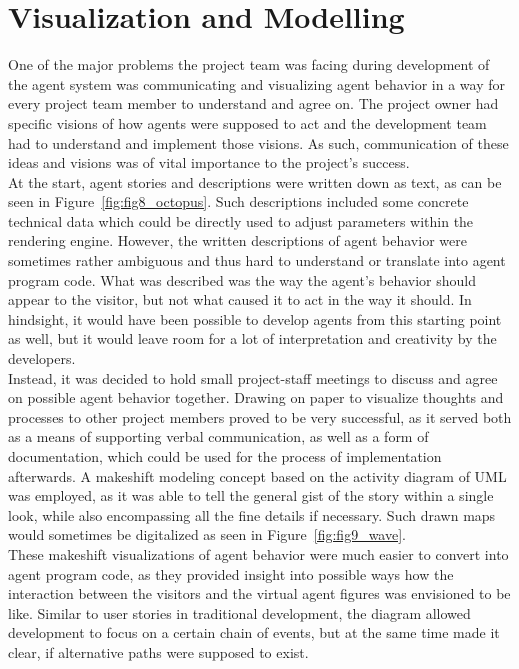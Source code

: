 \documentclass[draft,final]{vutinfth} %
\begin{document}
\section{Visualization and Modelling}
\label{visualization}

One of the major problems the project team was facing during development of the agent system was communicating and visualizing agent behavior in a way for every project team member to understand and agree on. 
The project owner had specific visions of how agents were supposed to act and the development team had to understand and implement those visions. 
As such, communication of these ideas and visions was of vital importance to the project’s success. \\
At the start, agent stories and descriptions were written down as text, as can be seen in Figure~\ref{fig:fig8_octopus}. 
Such descriptions included some concrete technical data which could be directly used to adjust parameters within the rendering engine. 
However, the written descriptions of agent behavior were sometimes rather ambiguous and thus hard to understand or translate into agent program code. 
What was described was the way the agent’s behavior should appear to the visitor, but not what caused it to act in the way it should. 
In hindsight, it would have been possible to develop agents from this starting point as well, but it would leave room for a lot of interpretation and creativity by the developers. \\
Instead, it was decided to hold small project-staff meetings to discuss and agree on possible agent behavior together. 
Drawing on paper to visualize thoughts and processes to other project members proved to be very successful, as it served both as a means of supporting verbal communication, as well as a form of documentation, which could be used for the process of implementation afterwards. 
A makeshift modeling concept based on the activity diagram of UML was employed, as it was able to tell the general gist of the story within a single look, while also encompassing all the fine details if necessary. 
Such drawn maps would sometimes be digitalized as seen in Figure~\ref{fig:fig9_wave}. \\
These makeshift visualizations of agent behavior were much easier to convert into agent program code, as they provided insight into possible ways how the interaction between the visitors and the virtual agent figures was envisioned to be like. 
Similar to user stories in traditional development, the diagram allowed development to focus on a certain chain of events, but at the same time made it clear, if alternative paths were supposed to exist. \\
\end{document}
